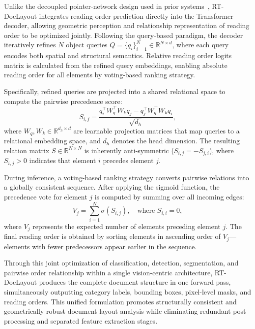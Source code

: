 \documentclass[11pt, a4paper,logo,  copyright, nonumbering]{paddleocr}
\begin{document}
Unlike the decoupled pointer-network design used in prior systems~\cite{cui2025paddleocrvlboostingmultilingualdocument}, 
RT-DocLayout integrates reading order prediction directly into the Transformer decoder, allowing geometric perception and relationship representation of reading order to be optimized jointly. 
Following the query-based paradigm, the decoder iteratively refines $N$ object queries 
$Q=\{q_i\}_{i=1}^{N}\in\mathbb{R}^{N\times d}$, where each query encodes both spatial and structural semantics. 
Relative reading order logits matrix is calculated from the refined query embeddings, enabling absolute reading order for all elements by voting-based ranking strategy.

Specifically, refined queries are projected into a shared relational space to compute the pairwise precedence score:
\begin{equation}
    S_{i,j}=\frac{q_i^\top W_q^\top W_k q_j - q_j^\top W_q^\top W_k q_i}{\sqrt{d_h}},
\end{equation}
where $W_q, W_k \in \mathbb{R}^{d_h \times d}$ are learnable projection matrices that map queries to a relational embedding space, and $d_h$ denotes the head dimension. The resulting relation matrix $S\in\mathbb{R}^{N\times N}$ is inherently anti-symmetric ($S_{i,j}=-S_{j,i}$), where $S_{i,j}>0$ indicates that element $i$ precedes element $j$.

During inference, a voting-based ranking strategy converts pairwise relations into a globally consistent sequence. After applying the sigmoid function, the precedence vote for element $j$ is computed by summing over all incoming edges:
\begin{equation}
    V_j=\sum_{i=1}^{N}\sigma(S_{i,j}), \quad \text{where } S_{i,i}=0,
\end{equation}
where $V_j$ represents the expected number of elements preceding element $j$. The final reading order is obtained by sorting elements in ascending order of $V_j$—elements with fewer predecessors appear earlier in the sequence.

Through this joint optimization of classification, detection, segmentation, and pairwise order relationship within a single vision-centric architecture, 
RT-DocLayout produces the complete document structure in one forward pass, simultaneously outputting category labels, bounding boxes, pixel-level masks, and reading orders. 
This unified formulation promotes structurally consistent and geometrically robust document layout analysis while eliminating redundant post-processing and separated feature extraction stages.
\end{document}
